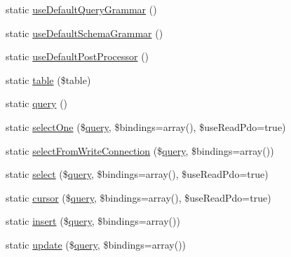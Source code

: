 \begin{DoxyCompactItemize}
static \mbox{\hyperlink{class_illuminate_1_1_support_1_1_facades_1_1_d_b_a3e64a124726e10a0381bc77b9a0a2323}{use\+Default\+Query\+Grammar}} ()
\item 
static \mbox{\hyperlink{class_illuminate_1_1_support_1_1_facades_1_1_d_b_ae4493947afc8b41bf2e9588c8a3bf1f7}{use\+Default\+Schema\+Grammar}} ()
\item 
static \mbox{\hyperlink{class_illuminate_1_1_support_1_1_facades_1_1_d_b_ab968071b7cebe44a4150e7421be3270d}{use\+Default\+Post\+Processor}} ()
\item 
static \mbox{\hyperlink{class_illuminate_1_1_support_1_1_facades_1_1_d_b_aab727b2bb999e68aafe6ddb5ffb6474a}{table}} (\$table)
\item 
static \mbox{\hyperlink{class_illuminate_1_1_support_1_1_facades_1_1_d_b_ae52c1b74f0ded858ed2dae6342fe5d96}{query}} ()
\item 
static \mbox{\hyperlink{class_illuminate_1_1_support_1_1_facades_1_1_d_b_aba70aca6582e031abf27e5d8fe0a45c7}{select\+One}} (\$\mbox{\hyperlink{class_illuminate_1_1_support_1_1_facades_1_1_d_b_ae52c1b74f0ded858ed2dae6342fe5d96}{query}}, \$bindings=array(), \$use\+Read\+Pdo=true)
\item 
static \mbox{\hyperlink{class_illuminate_1_1_support_1_1_facades_1_1_d_b_aab07a028986590a314f1298b4f111768}{select\+From\+Write\+Connection}} (\$\mbox{\hyperlink{class_illuminate_1_1_support_1_1_facades_1_1_d_b_ae52c1b74f0ded858ed2dae6342fe5d96}{query}}, \$bindings=array())
\item 
static \mbox{\hyperlink{class_illuminate_1_1_support_1_1_facades_1_1_d_b_a5a38160aff9e989f346ceb97d1b765c7}{select}} (\$\mbox{\hyperlink{class_illuminate_1_1_support_1_1_facades_1_1_d_b_ae52c1b74f0ded858ed2dae6342fe5d96}{query}}, \$bindings=array(), \$use\+Read\+Pdo=true)
\item 
static \mbox{\hyperlink{class_illuminate_1_1_support_1_1_facades_1_1_d_b_ab1ad06c52c19e7844542f8bfe41ef765}{cursor}} (\$\mbox{\hyperlink{class_illuminate_1_1_support_1_1_facades_1_1_d_b_ae52c1b74f0ded858ed2dae6342fe5d96}{query}}, \$bindings=array(), \$use\+Read\+Pdo=true)
\item 
static \mbox{\hyperlink{class_illuminate_1_1_support_1_1_facades_1_1_d_b_a3cb47a35deb04e11508027951e732490}{insert}} (\$\mbox{\hyperlink{class_illuminate_1_1_support_1_1_facades_1_1_d_b_ae52c1b74f0ded858ed2dae6342fe5d96}{query}}, \$bindings=array())
\item 
static \mbox{\hyperlink{class_illuminate_1_1_support_1_1_facades_1_1_d_b_a26f6462677e65ac55b2b8b9d59343c9f}{update}} (\$\mbox{\hyperlink{class_illuminate_1_1_support_1_1_facades_1_1_d_b_ae52c1b74f0ded858ed2dae6342fe5d96}{query}}, \$bindings=array())

\end{DoxyCompactItemize}
